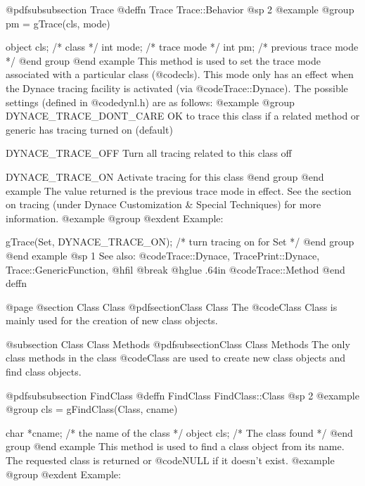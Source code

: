 @pdfsubsubsection {Trace}
@deffn {Trace} Trace::Behavior
@sp 2
@example
@group
pm = gTrace(cls, mode)

object  cls;    /*  class                */
int     mode;   /*  trace mode           */
int     pm;     /*  previous trace mode  */
@end group
@end example
This method is used to set the trace mode associated with a
particular class (@code{cls}).  This mode only has an effect when
the Dynace tracing facility is activated (via @code{Trace::Dynace}).
The possible settings (defined in @code{dynl.h}) are as follows:
@example
@group
DYNACE_TRACE_DONT_CARE   OK to trace this class if a related
                         method or generic has tracing turned
                         on (default)

DYNACE_TRACE_OFF         Turn all tracing related to this
                         class off

DYNACE_TRACE_ON          Activate tracing for this class
@end group
@end example
The value returned is the previous trace mode in effect.  See the
section on tracing (under Dynace Customization & Special Techniques) for
more information.
@example
@group
@exdent Example:

gTrace(Set, DYNACE_TRACE_ON); /* turn tracing on for Set */
@end group
@end example
@sp 1
See also:  @code{Trace::Dynace, TracePrint::Dynace, Trace::GenericFunction,}
@hfil @break @hglue .64in @code{Trace::Method}
@end deffn










@page
@section Class Class
@pdfsection{Class Class}
The @code{Class} Class is mainly used for the creation of new class objects.


@subsection Class Class Methods
@pdfsubsection{Class Class Methods}
The only class methods in the class @code{Class} are used to create new
class objects and find class objects.







@pdfsubsubsection {FindClass}
@deffn {FindClass} FindClass::Class
@sp 2
@example
@group
cls = gFindClass(Class, cname)

char    *cname; /*  the name of the class  */
object  cls;    /*  The class found        */
@end group
@end example
This method is used to find a class object from its name.  The requested
class is returned or @code{NULL} if it doesn't exist.
@example
@group
@exdent Example:

